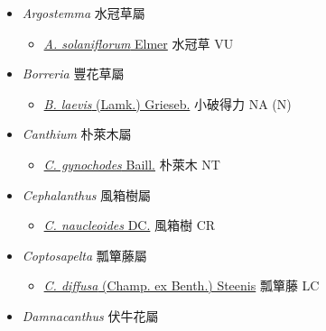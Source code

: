 
  \begin{itemize}
 \item[] \textit{Argostemma} 水冠草屬
                                
  \begin{itemize}
        \item[] \href{http://www.theplantlist.org/tpl1.1/search?q=Argostemma+solaniflorum}{\textit{A. solaniflorum} Elmer}   水冠草   VU
  \end{itemize}
 \item[] \textit{Borreria} 豐花草屬
                                
  \begin{itemize}
        \item[] \href{http://www.theplantlist.org/tpl1.1/search?q=Borreria+laevis}{\textit{B. laevis} (Lamk.) Grieseb.}   小破得力   NA (N)
  \end{itemize}
 \item[] \textit{Canthium} 朴萊木屬
                                
  \begin{itemize}
        \item[] \href{http://www.theplantlist.org/tpl1.1/search?q=Canthium+gynochodes}{\textit{C. gynochodes} Baill.}   朴萊木   NT
  \end{itemize}
 \item[] \textit{Cephalanthus} 風箱樹屬
                                
  \begin{itemize}
        \item[] \href{http://www.theplantlist.org/tpl1.1/search?q=Cephalanthus+naucleoides}{\textit{C. naucleoides} DC.}   風箱樹   CR
  \end{itemize}
 \item[] \textit{Coptosapelta} 瓢簞藤屬
                                
  \begin{itemize}
        \item[] \href{http://www.theplantlist.org/tpl1.1/search?q=Coptosapelta+diffusa}{\textit{C. diffusa} (Champ. ex Benth.) Steenis}   瓢簞藤   LC
  \end{itemize}
 \item[] \textit{Damnacanthus} 伏牛花屬
                                

\end{itemize}
